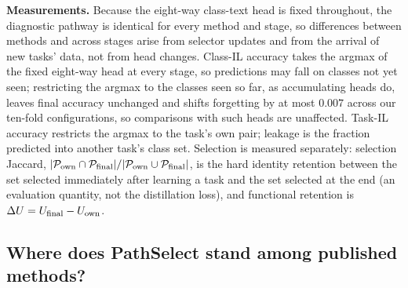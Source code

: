 \documentclass{article}
\newcommand{\Psel}{\mathcal{P}}
\begin{document}
\textbf{Measurements.}
Because the eight-way class-text head is fixed throughout, the diagnostic pathway is identical for every method and stage, so differences between methods and across stages arise from selector updates and from the arrival of new tasks' data, not from head changes. Class-IL accuracy takes the argmax of the fixed eight-way head at every stage, so predictions may fall on classes not yet seen; restricting the argmax to the classes seen so far, as accumulating heads do, leaves final accuracy unchanged and shifts forgetting by at most $0.007$ across our ten-fold configurations, so comparisons with such heads are unaffected. Task-IL accuracy restricts the argmax to the task's own pair; leakage is the fraction predicted into another task's class set. Selection is measured separately: selection Jaccard, $|\Psel_{\rm own}\cap\Psel_{\rm final}|/|\Psel_{\rm own}\cup\Psel_{\rm final}|$, is the hard identity retention between the set selected immediately after learning a task and the set selected at the end (an evaluation quantity, not the distillation loss), and functional retention is $\Delta U=U_{\rm final}-U_{\rm own}$.

\subsection{Where does PathSelect stand among published methods?}
\label{ssec:sota}
\end{document}
